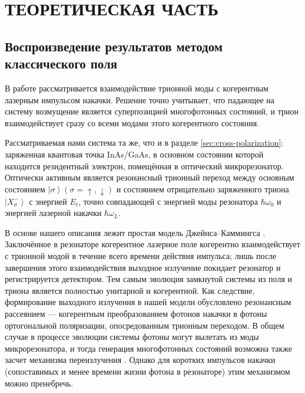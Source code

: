 \documentclass[11pt]{article}    %
\numberwithin{equation}{section}
\begin{document}

\newpage

\section{ТЕОРЕТИЧЕСКАЯ ЧАСТЬ}
\subsection{Воспроизведение результатов \cite{krainov2025} методом классического поля}
\label{sec:classical_field}

В работе \cite{krainov2025} рассматривается взаимодействие трионной
моды с когерентным лазерным импульсом накачки. Решение точно
учитывает, что падающее на систему возмущение является суперпозицией
многофотонных состояний, и трион взаимодействует сразу со всеми
модами этого когерентного состояния.

Рассматриваемая нами система та же, что и в разделе
\ref{sec:cross-polarization}: заряженная квантовая точка InAs/GaAs,
в основном состоянии которой находится резидентный электрон,
помещённая в оптический микрорезонатор. Оптически активным является
резонансный трионный переход между основным состоянием
$\left|\sigma\right\rangle (\sigma = \uparrow, \downarrow)$ и состоянием отрицательно заряженного
триона $\left|X^-_{\sigma}\right\rangle$ с энергией $E_t$, точно
совпадающей с энергией моды резонатора $\hbar\omega_0$ и энергией
лазерной накачки $\hbar\omega_L$.

В основе нашего описания лежит простая модель Джейнса--Каммингса \cite{scully1997}.
Заключённое в резонаторе когерентное лазерное поле когерентно
взаимодействует с трионной модой в течение всего времени действия
импульса; лишь после завершения этого взаимодействия выходное
излучение покидает резонатор и регистрируется детектором. Тем самым
эволюция замкнутой системы из поля и триона является полностью
унитарной и когерентной. Как следствие,
формирование выходного излучения в нашей модели обусловлено
резонансным рассеянием --- когерентным преобразованием фотонов
накачки в фотоны ортогональной поляризации, опосредованным трионным переходом.
В общем случае в процессе эволюции системы фотоны могут
вылетать из моды микрорезонатора, и тогда генерация многофотонных состояний
возможна также засчет механизма переизлучения \cite{fischer2017, fischer2018}.
Однако для коротких импульсов накачки (сопоставимых и менее времени жизни фотона
в резонаторе) этим механизмом можно пренебречь.
\end{document}
